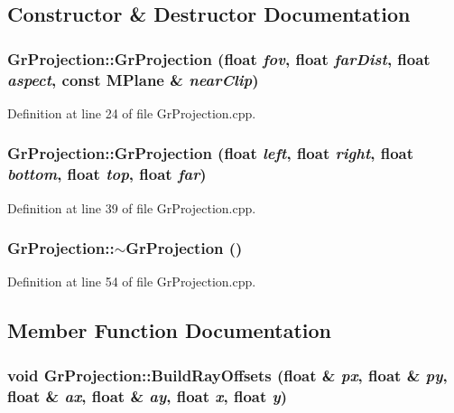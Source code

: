 \subsection{Constructor \& Destructor Documentation}
\hypertarget{class_gr_projection_55d2c10a1c3d7e47ce5b8b6fd69dd411}{
\subsubsection[{GrProjection}]{\setlength{\rightskip}{0pt plus 5cm}GrProjection::GrProjection (float {\em fov}, \/  float {\em farDist}, \/  float {\em aspect}, \/  const {\bf MPlane} \& {\em nearClip})}}
\label{class_gr_projection_55d2c10a1c3d7e47ce5b8b6fd69dd411}




Definition at line 24 of file GrProjection.cpp.\hypertarget{class_gr_projection_27b24c0dfda0a512db290333f1aecb07}{
\subsubsection[{GrProjection}]{\setlength{\rightskip}{0pt plus 5cm}GrProjection::GrProjection (float {\em left}, \/  float {\em right}, \/  float {\em bottom}, \/  float {\em top}, \/  float {\em far})}}
\label{class_gr_projection_27b24c0dfda0a512db290333f1aecb07}




Definition at line 39 of file GrProjection.cpp.\hypertarget{class_gr_projection_24795b4bdf7379373e7560f25ec7b19b}{
\subsubsection[{$\sim$GrProjection}]{\setlength{\rightskip}{0pt plus 5cm}GrProjection::$\sim$GrProjection ()}}
\label{class_gr_projection_24795b4bdf7379373e7560f25ec7b19b}




Definition at line 54 of file GrProjection.cpp.

\subsection{Member Function Documentation}
\hypertarget{class_gr_projection_29f014578f35e4a8386abda391966228}{
\subsubsection[{BuildRayOffsets}]{\setlength{\rightskip}{0pt plus 5cm}void GrProjection::BuildRayOffsets (float \& {\em px}, \/  float \& {\em py}, \/  float \& {\em ax}, \/  float \& {\em ay}, \/  float {\em x}, \/  float {\em y})}}
\label{class_gr_projection_29f014578f35e4a8386abda391966228}




